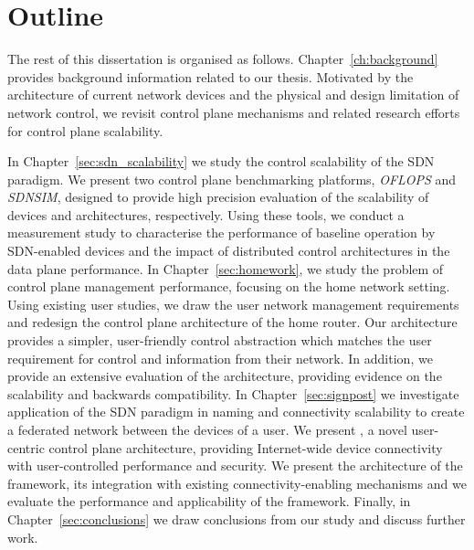\section{Outline} \label{sec:intro:outline}

The rest of this dissertation is organised as follows.
Chapter~\ref{ch:background} provides background information related to our
thesis. Motivated by the architecture of current network devices and the
physical and design limitation of network control, we revisit control plane
mechanisms and related research efforts for control plane scalability.  

In Chapter~\ref{sec:sdn_scalability} we study the control scalability of the SDN
paradigm.  We present two control plane benchmarking platforms, {\it OFLOPS}
\/and {\it SDNSIM}, designed to provide high precision evaluation of the
scalability of \of devices and architectures, respectively. Using these tools,
we conduct a measurement study to characterise the performance of baseline \of
operation by SDN-enabled devices and the impact of distributed control
architectures in the data plane performance.  In Chapter~\ref{sec:homework}, we
study the problem of control plane management performance, focusing on the home
network setting. Using existing user studies, we draw the user network
management requirements and redesign the control plane architecture of the home
router. Our architecture provides a simpler, user-friendly control abstraction
which matches the user requirement for control and information from their
network. In addition, we provide an extensive evaluation of the architecture,
providing evidence on the scalability and backwards compatibility.  In
Chapter~\ref{sec:signpost} we investigate application of the SDN paradigm in
naming and connectivity scalability to create a federated network between the
devices of a user. We present \signpost, a novel user-centric control plane
architecture, providing Internet-wide device connectivity with user-controlled
performance and security. We present the architecture of the framework, its
integration with existing connectivity-enabling mechanisms and we evaluate the
performance and applicability of the framework.  Finally, in
Chapter~\ref{sec:conclusions} we draw conclusions from our study and discuss
further work. 



